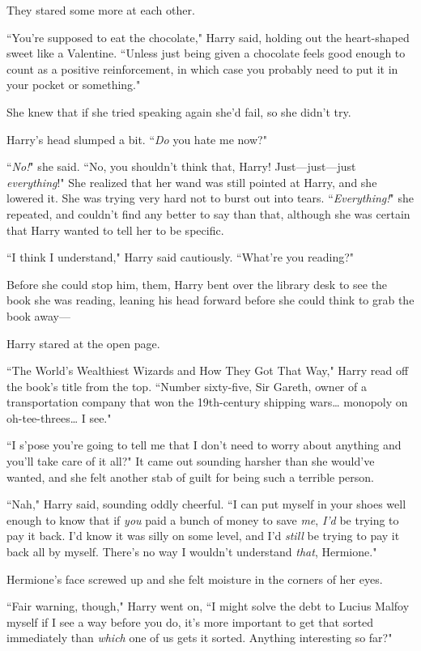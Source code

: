 They stared some more at each other.

``You're supposed to eat the chocolate," Harry said, holding out the heart-shaped sweet like a Valentine. ``Unless just being given a chocolate feels good enough to count as a positive reinforcement, in which case you probably need to put it in your pocket or something."

She knew that if she tried speaking again she'd fail, so she didn't try.

Harry's head slumped a bit. ``\emph{Do} you hate me now?"

``\emph{No!}" she said. ``No, you shouldn't think that, Harry! Just—just—just \emph{everything}!" She realized that her wand was still pointed at Harry, and she lowered it. She was trying very hard not to burst out into tears. ``\emph{Everything!}" she repeated, and couldn't find any better to say than that, although she was certain that Harry wanted to tell her to be specific.

``I think I understand," Harry said cautiously. ``What're you reading?"

Before she could stop him, them, Harry bent over the library desk to see the book she was reading, leaning his head forward before she could think to grab the book away—

Harry stared at the open page.

``The World's Wealthiest Wizards and How They Got That Way," Harry read off the book's title from the top. ``Number sixty-five, Sir Gareth, owner of a transportation company that won the 19th-century shipping wars{\ldots} monopoly on oh-tee-threes{\ldots} I see."

``I s'pose you're going to tell me that I don't need to worry about anything and you'll take care of it all?" It came out sounding harsher than she would've wanted, and she felt another stab of guilt for being such a terrible person.

``Nah," Harry said, sounding oddly cheerful. ``I can put myself in your shoes well enough to know that if \emph{you} paid a bunch of money to save \emph{me}, \emph{I'd} be trying to pay it back. I'd know it was silly on some level, and I'd \emph{still} be trying to pay it back all by myself. There's no way I wouldn't understand \emph{that}, Hermione."

Hermione's face screwed up and she felt moisture in the corners of her eyes.

``Fair warning, though," Harry went on, ``I might solve the debt to Lucius Malfoy myself if I see a way before you do, it's more important to get that sorted immediately than \emph{which} one of us gets it sorted. Anything interesting so far?"

